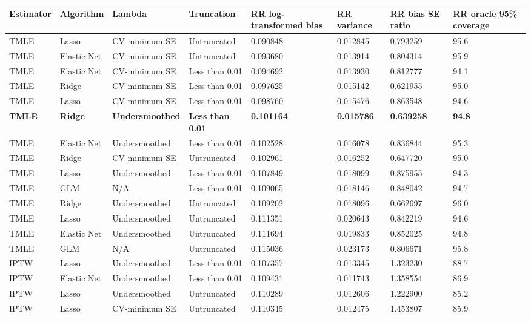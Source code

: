 
\begin{longtable}[l]{llllllll}
\toprule
Estimator & Algorithm & Lambda & Truncation & RR log-transformed bias & RR variance & RR bias SE ratio & RR oracle 95\% coverage\\
\midrule
TMLE & Lasso & CV-minimum SE & Untruncated & 0.090848 & 0.012845 & 0.793259 & 95.6\\
TMLE & Elastic Net & CV-minimum SE & Untruncated & 0.093680 & 0.013914 & 0.804314 & 95.9\\
TMLE & Elastic Net & CV-minimum SE & Less than 0.01 & 0.094692 & 0.013930 & 0.812777 & 94.1\\
TMLE & Ridge & CV-minimum SE & Less than 0.01 & 0.097625 & 0.015142 & 0.621955 & 95.0\\
TMLE & Lasso & CV-minimum SE & Less than 0.01 & 0.098760 & 0.015476 & 0.863548 & 94.6\\
\midrule
\textbf{TMLE} & \textbf{Ridge} & \textbf{Undersmoothed} & \textbf{Less than 0.01} & \textbf{0.101164} & \textbf{0.015786} & \textbf{0.639258} & \textbf{94.8}\\
\midrule
TMLE & Elastic Net & Undersmoothed & Less than 0.01 & 0.102528 & 0.016078 & 0.836844 & 95.3\\
TMLE & Ridge & CV-minimum SE & Untruncated & 0.102961 & 0.016252 & 0.647720 & 95.0\\
TMLE & Lasso & Undersmoothed & Less than 0.01 & 0.107849 & 0.018099 & 0.875955 & 94.3\\
TMLE & GLM & N/A & Less than 0.01 & 0.109065 & 0.018146 & 0.848042 & 94.7\\
TMLE & Ridge & Undersmoothed & Untruncated & 0.109202 & 0.018096 & 0.662697 & 96.0\\
TMLE & Lasso & Undersmoothed & Untruncated & 0.111351 & 0.020643 & 0.842219 & 94.6\\
TMLE & Elastic Net & Undersmoothed & Untruncated & 0.111694 & 0.019833 & 0.852025 & 94.8\\
TMLE & GLM & N/A & Untruncated & 0.115036 & 0.023173 & 0.806671 & 95.8\\
IPTW & Lasso & Undersmoothed & Less than 0.01 & 0.107357 & 0.013345 & 1.323230 & 88.7\\
IPTW & Elastic Net & Undersmoothed & Less than 0.01 & 0.109431 & 0.011743 & 1.358554 & 86.9\\
IPTW & Lasso & Undersmoothed & Untruncated & 0.110289 & 0.012606 & 1.222900 & 85.2\\
IPTW & Lasso & CV-minimum SE & Untruncated & 0.110345 & 0.012475 & 1.453807 & 85.9\\

\end{longtable}
